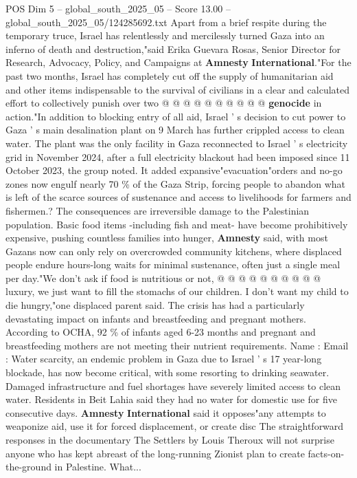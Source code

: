 \begin{textsample}{POS Dim 5 – global\_south\_2025\_05 – Score 13.00 – global\_south\_2025\_05/124285692.txt}
Apart from a brief respite during the temporary truce, Israel has relentlessly and mercilessly turned Gaza into an inferno of death and destruction,"said Erika Guevara Rosas, Senior Director for Research, Advocacy, Policy, and Campaigns at \textbf{Amnesty} \textbf{International}."For the past two months, Israel has completely cut off the supply of humanitarian aid and other items indispensable to the survival of civilians in a clear and calculated effort to collectively punish over two @ @ @ @ @ @ @ @ @ @ \textbf{genocide} in action."In addition to blocking entry of all aid, Israel ' s decision to cut power to Gaza ' s main desalination plant on 9 March has further crippled access to clean water.
The plant was the only facility in Gaza reconnected to Israel ' s electricity grid in November 2024, after a full electricity blackout had been imposed since 11 October 2023, the group noted.
It added expansive"evacuation"orders and no-go zones now engulf nearly 70 \% of the Gaza Strip, forcing people to abandon what is left of the scarce sources of sustenance and access to livelihoods for farmers and fishermen.?
The consequences are irreversible damage to the Palestinian population.
Basic food items -including fish and meat- have become prohibitively expensive, pushing countless families into hunger, \textbf{Amnesty} said, with most Gazans now can only rely on overcrowded community kitchens, where displaced people endure hours-long waits for minimal sustenance, often just a single meal per day."We don't ask if food is nutritious or not, @ @ @ @ @ @ @ @ @ @ luxury, we just want to fill the stomachs of our children.
I don't want my child to die hungry,"one displaced parent said.
The crisis has had a particularly devastating impact on infants and breastfeeding and pregnant mothers.
According to OCHA, 92 \% of infants aged 6-23 months and pregnant and breastfeeding mothers are not meeting their nutrient requirements.
Name : Email : Water scarcity, an endemic problem in Gaza due to Israel ' s 17 year-long blockade, has now become critical, with some resorting to drinking seawater.
Damaged infrastructure and fuel shortages have severely limited access to clean water.
Residents in Beit Lahia said they had no water for domestic use for five consecutive days. \textbf{Amnesty} \textbf{International} said it opposes"any attempts to weaponize aid, use it for forced displacement, or create disc The straightforward responses in the documentary The Settlers by Louis Theroux will not surprise anyone who has kept abreast of the long-running Zionist plan to create facts-on-the-ground in Palestine.
What...

\end{textsample}
